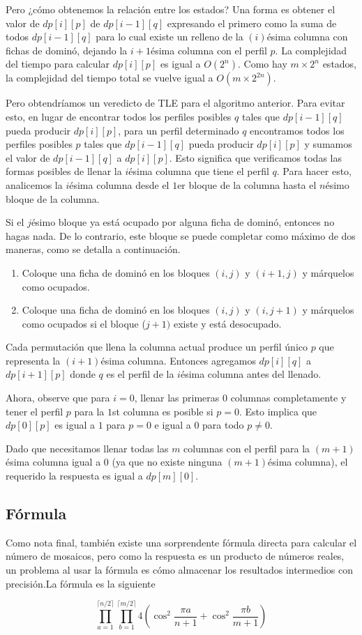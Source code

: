 Pero ¿cómo obtenemos la relación entre los estados? Una forma es obtener el valor de \(dp[i][p]\) de \(dp[i-1][q]\) expresando el primero como la suma de todos \(dp[i-1] [q]\) para lo cual existe un relleno de la \((i)\)ésima columna con fichas de dominó, dejando la \(i+1\)ésima columna con el perfil \(p\). La complejidad del tiempo para calcular \(dp[i][p]\) es igual a \(O(2^n)\). Como hay \(m \times 2^n\) estados, la complejidad del tiempo total se vuelve igual a \(O(m \times 2^{2n})\).


Pero obtendríamos un veredicto de TLE para el algoritmo anterior. Para evitar esto, en lugar de encontrar todos los perfiles posibles \(q\) tales que \(dp[i-1][q]\) pueda producir \(dp[i][p]\), para un perfil determinado \( q\) encontramos todos los perfiles posibles \(p\) tales que \(dp[i-1][q]\) pueda producir \(dp[i][p]\) y sumamos el valor de \(dp[ i-1][q]\) a \(dp[i][p]\). Esto significa que verificamos todas las formas posibles de llenar la \(i\)ésima columna que tiene el perfil \(q\). Para hacer esto, analicemos la \(i\)ésima columna desde el \(1\)er bloque de la columna hasta el \(n\)ésimo bloque de la columna.

Si el \(j\)ésimo bloque ya está ocupado por alguna ficha de dominó, entonces no hagas nada.
De lo contrario, este bloque se puede completar como máximo de dos maneras, como se detalla a continuación.

\begin{enumerate}
	\item Coloque una ficha de dominó en los bloques \((i,j)\) y \((i+1,j)\) y márquelos como ocupados.
	\item Coloque una ficha de dominó en los bloques \((i,j)\) y \((i,j+1)\) y márquelos como ocupados si el bloque (\(j+1)\) existe y está desocupado.
\end{enumerate}

Cada permutación que llena la columna actual produce un perfil único \(p\) que representa la \((i+1)\)ésima columna. Entonces agregamos \(dp[i][q]\) a \(dp[i+1][p]\) donde \(q\) es el perfil de la \(i\)ésima columna antes del llenado.

Ahora, observe que para \(i = 0\), llenar las primeras \(0\) columnas completamente y tener el perfil \(p\) para la \(1\)st columna es posible si \(p = 0\). Esto implica que \(dp[0][p]\) es igual a \(1\) para \(p = 0\) e igual a \(0\) para todo \(p \neq 0\).

Dado que necesitamos llenar todas las \(m\) columnas con el perfil para la \((m+1)\)ésima columna igual a 0 (ya que no existe ninguna \((m+1)\)ésima columna), el requerido la respuesta es igual a \(dp[m][0]\).

\subsection{Fórmula}
Como nota final, también existe una sorprendente fórmula directa para calcular el número de mosaicos, pero como la respuesta es un producto de números reales, un problema al usar la fórmula es cómo almacenar los resultados intermedios con precisión.La fórmula es la siguiente

$$ \prod_{a=1}^{\lceil n/2 \rceil } \prod_{b=1}^{\lceil m/2 \rceil } 4  (\cos^2 \frac{\pi a}{n+1} + \cos^2 \frac{\pi b}{m+1}) $$